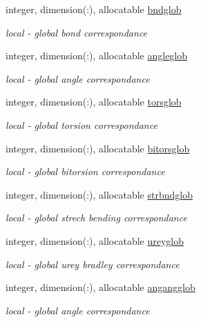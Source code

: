 \begin{DoxyCompactItemize}
integer, dimension(\-:), allocatable \hyperlink{classatmlst_a0b08d7cce39564c92ee3bfda3ef116b1}{bndglob}
\begin{DoxyCompactList}\small\item\em local -\/ global bond correspondance \end{DoxyCompactList}\item 
integer, dimension(\-:), allocatable \hyperlink{classatmlst_a45a7db0334c1ba50359a2d19c05e9dbb}{angleglob}
\begin{DoxyCompactList}\small\item\em local -\/ global angle correspondance \end{DoxyCompactList}\item 
integer, dimension(\-:), allocatable \hyperlink{classatmlst_a497e40aa26b6dad9191cbaef531576bb}{torsglob}
\begin{DoxyCompactList}\small\item\em local -\/ global torsion correspondance \end{DoxyCompactList}\item 
integer, dimension(\-:), allocatable \hyperlink{classatmlst_a03c51dbd08b70e4f7a2c697a4caf07e2}{bitorsglob}
\begin{DoxyCompactList}\small\item\em local -\/ global bitorsion correspondance \end{DoxyCompactList}\item 
integer, dimension(\-:), allocatable \hyperlink{classatmlst_a1291aa016a7d1f33b0f9ddbee54fcb02}{strbndglob}
\begin{DoxyCompactList}\small\item\em local -\/ global strech bending correspondance \end{DoxyCompactList}\item 
integer, dimension(\-:), allocatable \hyperlink{classatmlst_a3cf834b0b557782383f2506e1e0ea625}{ureyglob}
\begin{DoxyCompactList}\small\item\em local -\/ global urey bradley correspondance \end{DoxyCompactList}\item 
integer, dimension(\-:), allocatable \hyperlink{classatmlst_a6cb31850632c949a1f23b9502ee85d9f}{angangglob}
\begin{DoxyCompactList}\small\item\em local -\/ global angle correspondance \end{DoxyCompactList}\item 

\end{DoxyCompactItemize}
